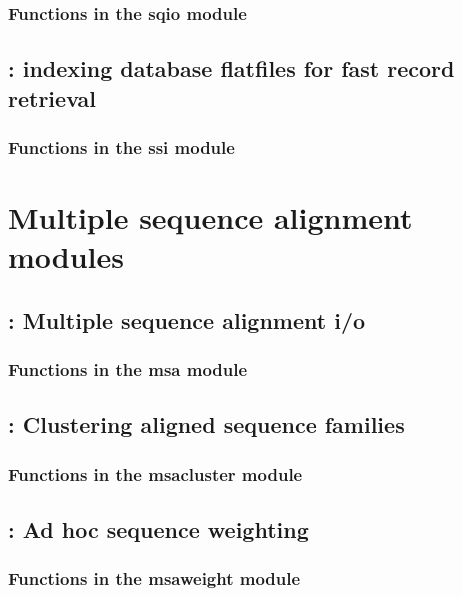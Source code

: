 \documentclass[10pt]{book}
\begin{document}
\subsection{Functions in the sqio module}


\newpage
\section{: indexing database flatfiles for fast record retrieval}

\subsection{Functions in the ssi module}




\chapter{Multiple sequence alignment modules}

\newpage
\section{: Multiple sequence alignment i/o}

\subsection{Functions in the msa module}


\newpage
\section{: Clustering aligned sequence families}

\subsection{Functions in the msacluster module}


\newpage
\section{: Ad hoc sequence weighting}

\subsection{Functions in the msaweight module}

\end{document}
